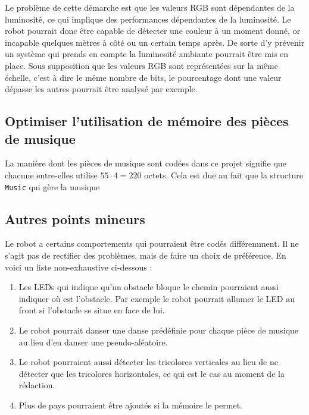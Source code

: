 \documentclass{article}
\begin{document}
    Le problème de cette démarche est que les valeurs RGB sont dépendantes de la luminosité, ce qui implique des performances dépendantes de la luminosité.
    Le robot pourrait donc être capable de détecter une couleur à un moment donné, or incapable quelques mètres à côté ou un certain temps après.
    De sorte d'y prévenir un système qui prends en compte la luminosité ambiante pourrait être mis en place.
    Sous supposition que les valeurs RGB sont représentées sur la même échelle, c'est à dire le même nombre de bits, le pourcentage dont une valeur dépasse les autres pourrait être analysé par exemple. 
    
    \subsection{Optimiser l'utilisation de mémoire des pièces de musique}
    La manière dont les pièces de musique sont codées dans ce projet signifie que chacune entre-elles utilise $55 \cdot 4 = 220$ octets.
    Cela est due au fait que la structure \texttt{Music} qui gère la musique
    
    \subsection{Autres points mineurs}
    Le robot a certains comportements qui pourraient être codés différemment.
    Il ne s'agit pas de rectifier des problèmes, mais de faire un choix de préférence.
    En voici un liste non-exhaustive ci-dessous : 
    \begin{enumerate}
        \item Les LEDs qui indique qu'un obstacle bloque le chemin pourraient aussi indiquer où est l'obstacle.
        Par exemple le robot pourrait allumer le LED au front si l'obstacle se situe en face de lui.
        \item Le robot pourrait danser une danse prédéfinie pour chaque pièce de musique au lieu d'en danser une pseudo-aléatoire.
        \item Le robot pourraient aussi détecter les tricolores verticales au lieu de ne détecter que les tricolores horizontales, ce qui est le cas au moment de la rédaction.
        \item Plus de pays pourraient être ajoutés si la mémoire le permet.
    \end{enumerate}
    
    
\end{document}
